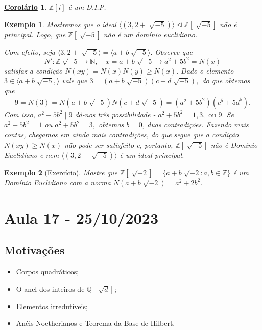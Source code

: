 \documentclass{article}
\newtheorem{example}{\underline{Exemplo}}
\newtheorem*{crl*}{\underline{Corolário}}
\begin{document}
    \begin{crl*}
      \(\mathbb{Z}[i]\) é um D.I.P.
    \end{crl*}
    \begin{example}
      Mostremos que o ideal \(\langle (3, 2 + \sqrt[]{-5}) \rangle \trianglelefteq{\mathbb{Z}[\sqrt[]{-5}]}\) não é principal. Logo, que
      \(\mathbb{Z}[\sqrt[]{-5}]\) não é um domínio euclidiano.

      Com efeito, seja \(\langle 3, 2 + \sqrt[]{-5} \rangle = \langle a + b\sqrt[]{-5} \rangle.\) Observe que 
      \[
        N':\mathbb{Z}\sqrt[]{-5}\rightarrow \mathbb{N},\quad x = a+b\sqrt[]{-5}\mapsto a^{2}+5b^{2} = N(x)
      \]
      satisfaz a condição \(N(xy) = N(x)N(y)\geq N(x).\) Dado o elemento \(3\in \langle a + b\sqrt[]{-5}, \rangle\)
      vale que \(3 = (a+b\sqrt[]{-5})(c+d\sqrt[]{-5}),\) do que obtemos que 
      \[
        9 = N(3) = N(a+b\sqrt[]{-5})N(c+d\sqrt[]{-5}) = (a^{2}+5b^{2})(c^{5}+5d^{5}).
      \]
      Com isso, \(a^{2}+5b^{2}\mid 9\) dá-nos três possibilidade - \(a^{2} + 5b^{2} = 1, 3,\text{ ou }9.\)
      Se \(a^{2} + 5b^{2} = 1\) ou \(a^{2} + 5b^{2} = 3,\) obtemos \(b = 0\), duas contradições. Fazendo mais contas,
      chegamos em ainda mais contradições, do que segue que a condição \(N(xy)\geq N(x)\) não pode ser satisfeito e, portanto,
      \(\mathbb{Z}[\sqrt[]{-5}]\) não é Domínio Euclidiano e nem \(\langle (3, 2+\sqrt[]{-5}) \rangle\) é um ideal principal.
    \end{example}
    \begin{example}[Exercício]
      Mostre que \(\mathbb{Z}[\sqrt[]{-2}] = \{a + b\sqrt[]{-2}: a, b\in \mathbb{Z}\}\) é um Domínio
      Euclidiano com a norma \(N(a+b\sqrt[]{-2}) = a^{2} + 2b^{2}.\)
    \end{example}
    \newpage

    \section{Aula 17 - 25/10/2023}
    \subsection{Motivações} 
    \begin{itemize}
      \item Corpos quadráticos;
      \item O anel dos inteiros de \(\mathbb{Q}[\sqrt[]{d}]\);
      \item Elementos irredutíveis;
      \item Anéis Noetherianos e Teorema da Base de Hilbert.
    \end{itemize}
\end{document}
